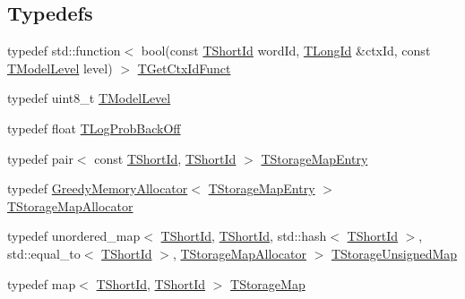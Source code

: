 \subsection*{Typedefs}
\begin{DoxyCompactItemize}
\item 
typedef std\+::function$<$ bool(const \hyperlink{namespaceuva_1_1smt_1_1hashing_adcf22e1982ad09d3a63494c006267469}{T\+Short\+Id} word\+Id, \hyperlink{namespaceuva_1_1smt_1_1hashing_a5992ac0dea0fb3226fb403ede09fad55}{T\+Long\+Id} \&ctx\+Id, const \hyperlink{namespaceuva_1_1smt_1_1tries_a20577a44b3a42d26524250634379b7cb}{T\+Model\+Level} level) $>$ \hyperlink{namespaceuva_1_1smt_1_1tries_a535548b30b94f85d4b3457a383f8076e}{T\+Get\+Ctx\+Id\+Funct}
\item 
typedef uint8\+\_\+t \hyperlink{namespaceuva_1_1smt_1_1tries_a20577a44b3a42d26524250634379b7cb}{T\+Model\+Level}
\item 
typedef float \hyperlink{namespaceuva_1_1smt_1_1tries_acd0660255dd9ef5d644f01de49102750}{T\+Log\+Prob\+Back\+Off}
\item 
typedef pair$<$ const \hyperlink{namespaceuva_1_1smt_1_1hashing_adcf22e1982ad09d3a63494c006267469}{T\+Short\+Id}, \hyperlink{namespaceuva_1_1smt_1_1hashing_adcf22e1982ad09d3a63494c006267469}{T\+Short\+Id} $>$ \hyperlink{namespaceuva_1_1smt_1_1tries_affc598132a51209f50d781cf01733996}{T\+Storage\+Map\+Entry}
\item 
typedef \hyperlink{classuva_1_1smt_1_1tries_1_1alloc_1_1_greedy_memory_allocator}{Greedy\+Memory\+Allocator}$<$ \hyperlink{namespaceuva_1_1smt_1_1tries_affc598132a51209f50d781cf01733996}{T\+Storage\+Map\+Entry} $>$ \hyperlink{namespaceuva_1_1smt_1_1tries_a80642b3331407e41b0aca518e3a1ac31}{T\+Storage\+Map\+Allocator}
\item 
typedef unordered\+\_\+map$<$ \hyperlink{namespaceuva_1_1smt_1_1hashing_adcf22e1982ad09d3a63494c006267469}{T\+Short\+Id}, \hyperlink{namespaceuva_1_1smt_1_1hashing_adcf22e1982ad09d3a63494c006267469}{T\+Short\+Id}, std\+::hash$<$ \hyperlink{namespaceuva_1_1smt_1_1hashing_adcf22e1982ad09d3a63494c006267469}{T\+Short\+Id} $>$, std\+::equal\+\_\+to$<$ \hyperlink{namespaceuva_1_1smt_1_1hashing_adcf22e1982ad09d3a63494c006267469}{T\+Short\+Id} $>$, \hyperlink{namespaceuva_1_1smt_1_1tries_a80642b3331407e41b0aca518e3a1ac31}{T\+Storage\+Map\+Allocator} $>$ \hyperlink{namespaceuva_1_1smt_1_1tries_a51747124086c47f6b3eb7b66599dbc81}{T\+Storage\+Unsigned\+Map}
\item 
typedef map$<$ \hyperlink{namespaceuva_1_1smt_1_1hashing_adcf22e1982ad09d3a63494c006267469}{T\+Short\+Id}, \hyperlink{namespaceuva_1_1smt_1_1hashing_adcf22e1982ad09d3a63494c006267469}{T\+Short\+Id} $>$ \hyperlink{namespaceuva_1_1smt_1_1tries_adcb2d50a97c40fe1a3509d9f798c1d3b}{T\+Storage\+Map}
\end{DoxyCompactItemize}
